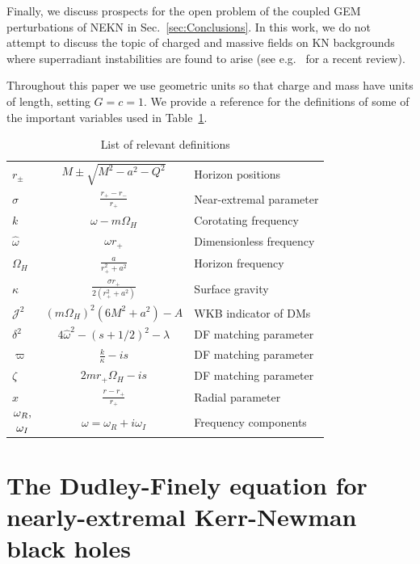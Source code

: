\begin{refsection}
Finally, we discuss prospects for the open problem of the coupled GEM perturbations of NEKN in Sec.~\ref{sec:Conclusions}.
In this work, we do not attempt to discuss the topic of charged and massive fields on KN backgrounds where superradiant instabilities are found to arise (see e.g.~\cite{Brito:2015oca} for a recent review).

Throughout this paper we use geometric units so that charge and mass have units of length, setting $G = c =1$. We provide a reference for the definitions of some of the important variables used in Table~\ref{tab:VarList}.

\begin{table}
\renewcommand{\arraystretch}{2}
\caption{
\label{tab:VarList}
List of relevant definitions
}
\begin{tabular}{@{} l c l @{}}
$r_\pm$ & $\displaystyle M \pm \sqrt{M^2 - a^2 -Q^2}$ & Horizon positions \\
$\sigma$ & $\displaystyle \frac{r_+ - r_-}{r_+}$ & Near-extremal parameter \\
$k$ & $\omega - m \Omega_H$ &  Corotating frequency \\
$\hat{\omega}$ & $\omega r_+$ & Dimensionless frequency \\
$ \Omega_H$ & $\displaystyle \frac{a}{r_+^2 +a^2}$ & Horizon frequency \\
$\kappa$ & $\displaystyle  \frac{\sigma r_+}{2(r_+^2 +a^2)}$ & Surface gravity \\
$\mathcal J^2$ & $(m \Omega_H)^2(6M^2 +a^2) - A$ & WKB indicator of DMs \\
$\delta^2$ & $\displaystyle 4 \hat{\omega}^2- (s+1/2)^2 - \lambda$ & DF matching parameter \\
$\varpi$ & $\displaystyle \frac{k}{\kappa}  - i s $ & DF matching parameter \\ 
$\zeta$ & $2m r_+ \Omega_H - i s$ & DF matching parameter \\ 
$x$ & $\displaystyle \frac{r-r_+}{r_+} $ & Radial parameter \\
$\displaystyle{\genfrac{}{}{0pt}{}{\omega_R,} {\omega_I}}$ & $\omega = \omega_R + i \omega_I$ & Frequency components
\end{tabular}
\end{table}


\section{The Dudley-Finely equation for nearly-extremal Kerr-Newman black holes}
\label{sec:DF}


\end{refsection}
